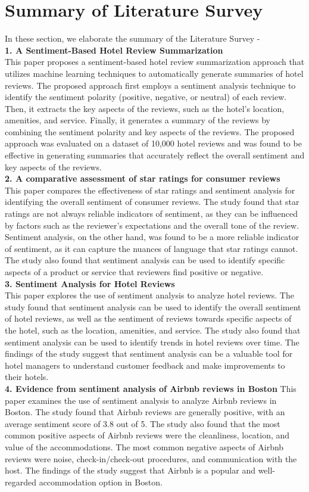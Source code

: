 \documentclass[a4paper, 12pt]{report}
\begin{document}
\section{Summary of Literature Survey}
In these section, we elaborate the summary of the Literature Survey -\\
\textbf{1. A Sentiment-Based Hotel Review Summarization}\\
This paper proposes a sentiment-based hotel review summarization approach that utilizes machine learning techniques to automatically generate summaries of hotel reviews. The proposed approach first employs a sentiment analysis technique to identify the sentiment polarity (positive, negative, or neutral) of each review. Then, it extracts the key aspects of the reviews, such as the hotel's location, amenities, and service. Finally, it generates a summary of the reviews by combining the sentiment polarity and key aspects of the reviews. The proposed approach was evaluated on a dataset of 10,000 hotel reviews and was found to be effective in generating summaries that accurately reflect the overall sentiment and key aspects of the reviews.\\
\textbf{2. A comparative assessment of star ratings for consumer reviews}\\
This paper compares the effectiveness of star ratings and sentiment analysis for identifying the overall sentiment of consumer reviews. The study found that star ratings are not always reliable indicators of sentiment, as they can be influenced by factors such as the reviewer's expectations and the overall tone of the review. Sentiment analysis, on the other hand, was found to be a more reliable indicator of sentiment, as it can capture the nuances of language that star ratings cannot. The study also found that sentiment analysis can be used to identify specific aspects of a product or service that reviewers find positive or negative.\\
\textbf{3. Sentiment Analysis for Hotel Reviews}\\
This paper explores the use of sentiment analysis to analyze hotel reviews. The study found that sentiment analysis can be used to identify the overall sentiment of hotel reviews, as well as the sentiment of reviews towards specific aspects of the hotel, such as the location, amenities, and service. The study also found that sentiment analysis can be used to identify trends in hotel reviews over time. The findings of the study suggest that sentiment analysis can be a valuable tool for hotel managers to understand customer feedback and make improvements to their hotels.\\
\textbf{4. Evidence from sentiment analysis of Airbnb reviews in Boston}
This paper examines the use of sentiment analysis to analyze Airbnb reviews in Boston. The study found that Airbnb reviews are generally positive, with an average sentiment score of 3.8 out of 5. The study also found that the most common positive aspects of Airbnb reviews were the cleanliness, location, and value of the accommodations. The most common negative aspects of Airbnb reviews were noise, check-in/check-out procedures, and communication with the host. The findings of the study suggest that Airbnb is a popular and well-regarded accommodation option in Boston.
\end{document}
